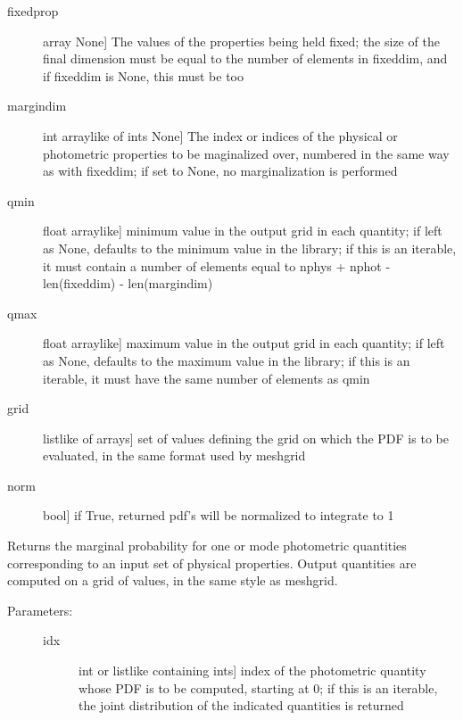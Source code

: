 \documentclass[letterpaper,10pt,english]{sphinxmanual}
\begin{document}
\begin{fulllineitems}
\begin{fulllineitems}
\begin{description}
\begin{description}
\item[{fixedprop}] \leavevmode{[}array \textbar{} None{]}
The values of the properties being held fixed; the size
of the final dimension must be equal to the number of
elements in fixeddim, and if fixeddim is None, this must
be too

\item[{margindim}] \leavevmode{[}int \textbar{} arraylike of ints \textbar{} None{]}
The index or indices of the physical or photometric
properties to be maginalized over, numbered in the same
way as with fixeddim; if set to None, no marginalization
is performed

\item[{qmin}] \leavevmode{[}float \textbar{} arraylike{]}
minimum value in the output grid in each quantity; if
left as None, defaults to the minimum value in the
library; if this is an iterable, it must contain a
number of elements equal to nphys + nphot -
len(fixeddim) - len(margindim)

\item[{qmax}] \leavevmode{[}float \textbar{} arraylike{]}
maximum value in the output grid in each quantity; if
left as None, defaults to the maximum value in the
library; if this is an iterable, it must have the same
number of elements as qmin

\item[{grid}] \leavevmode{[}listlike of arrays{]}
set of values defining the grid on which the PDF is to
be evaluated, in the same format used by meshgrid

\item[{norm}] \leavevmode{[}bool{]}
if True, returned pdf's will be normalized to integrate
to 1

\end{description}

\end{description}

\end{fulllineitems}


\begin{fulllineitems}
\label{bayesphot:slugpy.bayesphot.bp.bp.mpdf_phot}
Returns the marginal probability for one or mode photometric
quantities corresponding to an input set of physical
properties. Output quantities are computed on a grid of
values, in the same style as meshgrid.
\begin{description}
\item[{Parameters:}] \leavevmode\begin{description}
\item[{idx}] \leavevmode{[}int or listlike containing ints{]}
index of the photometric quantity whose PDF is to be
computed, starting at 0; if this is an iterable, the
joint distribution of the indicated quantities is returned


\end{description}
\end{description}
\end{fulllineitems}
\end{fulllineitems}
\end{document}
